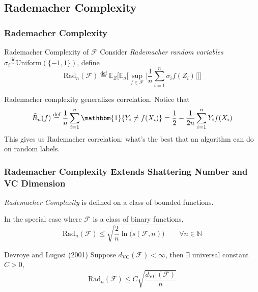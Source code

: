 \documentclass{beamer}
\begin{document}
\subsection{Rademacher Complexity} 
\begin{frame}
\frametitle{Rademacher Complexity} 

\begin{block}{Rademacher Complexity of $\mathcal{F}$}
Consider \textit{Rademacher random variables} $\sigma_i \stackrel{\text{iid}}{\sim} \text{Uniform}(\{-1, 1\})$, define 
$$ \text{Rad}_n(\mathcal{F}) \stackrel{\text{def}}{=} \mathbb{E}_{Z}\bigg[ \mathbb{E}_{\sigma}\bigg[ \sup_{f \in \mathcal{F}} \bigg| \frac{1}{n}\sum_{i=1}^{n} \sigma_i f(Z_i) \bigg| \bigg] \bigg] $$
\end{block}
Rademacher complexity generalizes correlation. Notice that 
$$ \widehat{R}_{n}(f) \stackrel{\text{def}}{=} \frac{1}{n}\sum_{i=1}^{n} \mathbbm{1}\{ Y_i \neq f(X_i) \} = \frac{1}{2} - \frac{1}{2n}\sum_{i=1}^{n} Y_if(X_i)$$
This gives us Rademacher correlation: what's the best that an algorithm can do on random labels. 

\end{frame}


\begin{frame}
\frametitle{Rademacher Complexity Extends Shattering Number and VC Dimension} 

\textit{Rademacher Complexity} is defined on a class of bounded functions. 
\begin{block}{In the special case where $\mathcal{F}$ is a class of binary functions,}
$$ \text{Rad}_n(\mathcal{F}) \leq \sqrt{\frac{2}{n} \ln\big( s(\mathcal{F}, n) \big)} \qquad \forall n \in \mathbb{N} $$
\end{block}

\begin{block}{Devroye and Lugosi (2001)}
Suppose $d_{\text{VC}}(\mathcal{F}) < \infty$, then $\exists$ universal constant $C > 0$, 
$$ \text{Rad}_n(\mathcal{F}) \leq C \sqrt{\frac{d_{\text{VC}}(\mathcal{F})}{n}} $$
\end{block}

\end{frame}

\end{document}
